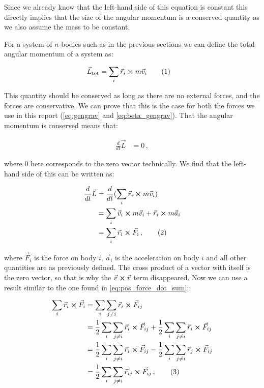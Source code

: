 \documentclass[reprint,english,notitlepage]{revtex4-1}  %
\newcommand\numberthis{\addtocounter{equation}{1}\tag{\theequation}}
\begin{document}
Since we already know that the left-hand side of this equation is constant this directly implies that the size of the angular momentum is a conserved quantity as we also assume the mass to be constant.

For a system of $n$-bodies such as in the previous sections we can define the total angular momentum of a system as:

\begin{align*}
\vec{L}_\text{tot} &= \sum\limits_i \vec{r}_i \cross m\vec{v}_i \numberthis \label{eq:tot_ang_mom}
\end{align*}

This quantity should be conserved as long as there are no external forces, and the forces are conservative. We can prove that this is the case for both the forces we use in this report (\eqref{eq:gengrav} and \eqref{eq:beta_gengrav}). That the angular momentum is conserved means that:

\begin{align*}
\frac{d}{dt} \vec{L} &= 0 \, ,
\end{align*}

where 0 here corresponds to the zero vector technically. We find that the left-hand side of this can be written as:

\begin{align*}
\frac{d}{dt} \vec{L} &= \frac{d}{dt} (\sum\limits_i \vec{r}_i \cross m \vec{v}_i)  \\
&= \sum\limits_i \vec{v}_i \cross m \vec{v}_i + \vec{r}_i \cross m \vec{a}_i \\
&= \sum\limits_i \vec{r}_i \cross \vec{F}_i  \, , \numberthis \label{eq:interm_ang_mom_cons}
\end{align*}

where $\vec{F}_i$ is the force on body $i$, $\vec{a}_i$ is the acceleration on body $i$ and all other quantities are as previously defined. The cross product of a vector with itself is the zero vector, so that is why the $\vec{v} \cross \vec{v}$ term disappeared. Now we can use a result similar to the one found in \eqref{eq:pos_force_dot_sum}:

\begin{align*}
\sum\limits_i \vec{r}_i \cross \vec{F}_i &= \sum\limits_i \sum\limits_{j \neq i} \vec{r}_i \cross \vec{F}_{ij} \\
&= \frac{1}{2} \sum\limits_i \sum\limits_{j \neq i} \vec{r}_i \cross \vec{F}_{ij} + \frac{1}{2} \sum\limits_i \sum\limits_{j \neq i} \vec{r}_i \cross \vec{F}_{ij} \\
&= \frac{1}{2} \sum\limits_i \sum\limits_{j \neq i} \vec{r}_i \cross \vec{F}_{ij} - \frac{1}{2} \sum\limits_i \sum\limits_{j \neq i} \vec{r}_j \cross \vec{F}_{ij} \\
&= \frac{1}{2} \sum\limits_i \sum\limits_{j\neq i } \vec{r}_{ij} \cross \vec{F}_{ij} \, , \numberthis \label{eq:pos_cross_force_sum}
\end{align*}
\end{document}
